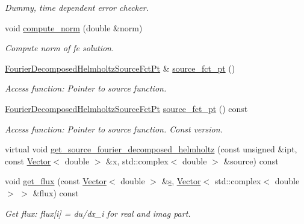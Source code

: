 \begin{DoxyCompactItemize}
\begin{DoxyCompactList}\small\item\em Dummy, time dependent error checker. \end{DoxyCompactList}\item 
void \hyperlink{classoomph_1_1FourierDecomposedHelmholtzEquations_a8139e48ff406de0f7b2c76d007b9e7e3}{compute\+\_\+norm} (double \&norm)
\begin{DoxyCompactList}\small\item\em Compute norm of fe solution. \end{DoxyCompactList}\item 
\hyperlink{classoomph_1_1FourierDecomposedHelmholtzEquations_a66a39c7967ffeedd994c206e2a5f0d4e}{Fourier\+Decomposed\+Helmholtz\+Source\+Fct\+Pt} \& \hyperlink{classoomph_1_1FourierDecomposedHelmholtzEquations_aa27c6f570be67df3e68c26f6e28fc28a}{source\+\_\+fct\+\_\+pt} ()
\begin{DoxyCompactList}\small\item\em Access function\+: Pointer to source function. \end{DoxyCompactList}\item 
\hyperlink{classoomph_1_1FourierDecomposedHelmholtzEquations_a66a39c7967ffeedd994c206e2a5f0d4e}{Fourier\+Decomposed\+Helmholtz\+Source\+Fct\+Pt} \hyperlink{classoomph_1_1FourierDecomposedHelmholtzEquations_aa269e954c4deb57296defd467c90c7bc}{source\+\_\+fct\+\_\+pt} () const
\begin{DoxyCompactList}\small\item\em Access function\+: Pointer to source function. Const version. \end{DoxyCompactList}\item 
virtual void \hyperlink{classoomph_1_1FourierDecomposedHelmholtzEquations_af35f759fbed7364ef09250161dc32e93}{get\+\_\+source\+\_\+fourier\+\_\+decomposed\+\_\+helmholtz} (const unsigned \&ipt, const \hyperlink{classoomph_1_1Vector}{Vector}$<$ double $>$ \&x, std\+::complex$<$ double $>$ \&source) const
\item 
void \hyperlink{classoomph_1_1FourierDecomposedHelmholtzEquations_ae8d93aac73e1dec5e7f771c1000a3c46}{get\+\_\+flux} (const \hyperlink{classoomph_1_1Vector}{Vector}$<$ double $>$ \&\hyperlink{cfortran_8h_ab7123126e4885ef647dd9c6e3807a21c}{s}, \hyperlink{classoomph_1_1Vector}{Vector}$<$ std\+::complex$<$ double $>$ $>$ \&flux) const
\begin{DoxyCompactList}\small\item\em Get flux\+: flux\mbox{[}i\mbox{]} = du/dx\+\_\+i for real and imag part. \end{DoxyCompactList}\item 

\end{DoxyCompactItemize}
